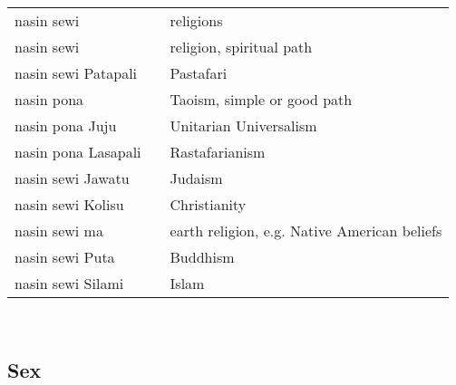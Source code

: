 \begin{supertabular}{p{4,5cm}|ll}
    nasin sewi          &  & religions                                    \\
    nasin sewi          &  & religion, spiritual path                     \\
    nasin sewi Patapali &  & Pastafari                                    \\
    nasin pona          &  & Taoism, simple or good path                  \\
    nasin pona Juju     &  & Unitarian Universalism                       \\
    nasin pona Lasapali &  & Rastafarianism                               \\
    nasin sewi Jawatu   &  & Judaism                                      \\
    nasin sewi Kolisu   &  & Christianity                                 \\
    nasin sewi ma       &  & earth religion, e.g. Native American beliefs \\
    nasin sewi Puta     &  & Buddhism                                     \\
    nasin sewi Silami   &  & Islam                                        \\
\end{supertabular} \\

\subsection{Sex}

